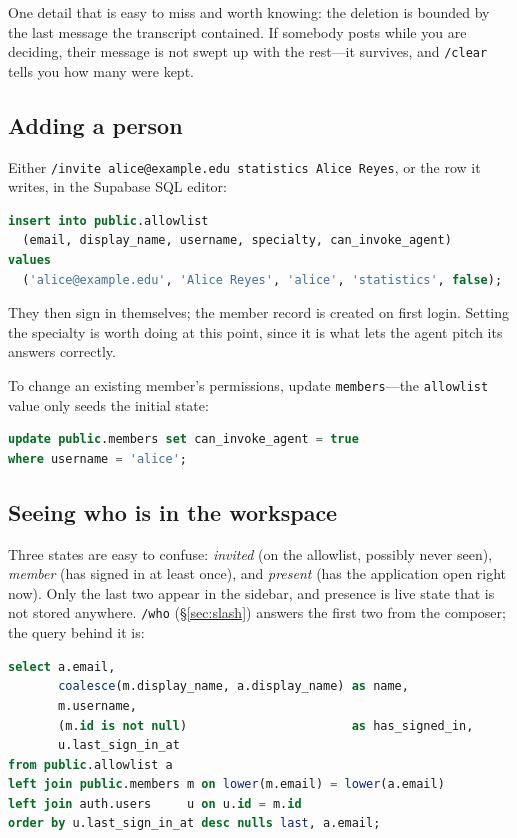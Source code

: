 \documentclass[11pt,letterpaper]{article}
\begin{document}
One detail that is easy to miss and worth knowing: the deletion is bounded by
the last message the transcript contained. If somebody posts while you are
deciding, their message is not swept up with the rest---it survives, and
\texttt{/clear} tells you how many were kept.

\subsection{Adding a person}

Either \texttt{/invite alice@example.edu statistics Alice Reyes}, or the row
it writes, in the Supabase SQL editor:

\begin{lstlisting}[language=SQL]
insert into public.allowlist
  (email, display_name, username, specialty, can_invoke_agent)
values
  ('alice@example.edu', 'Alice Reyes', 'alice', 'statistics', false);
\end{lstlisting}

They then sign in themselves; the member record is created on first login.
Setting the specialty is worth doing at this point, since it is what lets the
agent pitch its answers correctly.

To change an existing member's permissions, update \texttt{members}---the
\texttt{allowlist} value only seeds the initial state:

\begin{lstlisting}[language=SQL]
update public.members set can_invoke_agent = true
where username = 'alice';
\end{lstlisting}

\subsection{Seeing who is in the workspace}

Three states are easy to confuse: \emph{invited} (on the allowlist, possibly
never seen), \emph{member} (has signed in at least once), and \emph{present}
(has the application open right now). Only the last two appear in the sidebar,
and presence is live state that is not stored anywhere. \texttt{/who}
(\S\ref{sec:slash}) answers the first two from the composer; the query behind
it is:

\begin{lstlisting}[language=SQL]
select a.email,
       coalesce(m.display_name, a.display_name) as name,
       m.username,
       (m.id is not null)                       as has_signed_in,
       u.last_sign_in_at
from public.allowlist a
left join public.members m on lower(m.email) = lower(a.email)
left join auth.users     u on u.id = m.id
order by u.last_sign_in_at desc nulls last, a.email;
\end{lstlisting}
\end{document}
